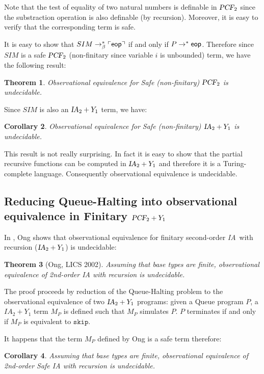 \documentclass{article}
\newtheorem{theorem}{Theorem}[section]
\newtheorem{corollary}[theorem]{Corollary}
\newcommand{\encode}[1]{\ulcorner #1 \urcorner}
\newcommand\eop{{\sf eop}}
\newcommand{\betared}{\rightarrow_\beta}
\newcommand\ialgol{{\textsl{IA}}}
\newcommand\pcf{\textsl{PCF}}
\newcommand\iaskip{\texttt{skip}}
\begin{document}
Note that the test of equality of two natural numbers is definable in $\pcf_2$ since the substraction operation is  also definable (by recursion). Moreover, it is easy to verify that the corresponding term is safe.


It is easy to show that $SIM \betared^* \encode{\eop}$ if and only if $P \rightarrow^* \eop$. Therefore since $SIM$ is a safe $\pcf_2$ 
(non-finitary since variable $i$ is unbounded) term, we have the following result:
\begin{theorem}
Observational equivalence for Safe (non-finitary) $\pcf_2$ is undecidable.
\end{theorem}
Since $SIM$ is also an $\ialgol_2 + Y_1$ term, we have:
\begin{corollary}
Observational equivalence for Safe (non-finitary) $\ialgol_2 + Y_1$ is undecidable.
\end{corollary}

This result is not really surprising. In fact it is easy to show that the partial recursive functions can be computed in $\ialgol_2 + Y_1$ and therefore it is a Turing-complete language. Consequently observational equivalence is undecidable.


\subsection{Reducing Queue-Halting into observational equivalence in Finitary $\pcf_2 + Y_1$}

In \cite{Ong02}, Ong shows that observational equivalence for finitary second-order \ialgol\ with recursion ($\ialgol_2 + Y_1$) is undecidable:
\begin{theorem}[Ong, LICS 2002]
Assuming that base types are finite, observational equivalence of 2nd-order IA with recursion is undecidable.
\end{theorem}

The proof proceeds by reduction of the Queue-Halting problem to the observational equivalence of two $\ialgol_2 + Y_1$ programs:
given a Queue program $P$, a $IA_2 + Y_1$ term $M_P$ is defined such that $M_P$ simulates $P$. $P$ terminates if and only if $M_P$ is equivalent to $\iaskip$.

It happens that the term $M_P$ defined by Ong is a safe term therefore:
\begin{corollary}
Assuming that base types are finite, observational equivalence of 2nd-order Safe IA with recursion is undecidable.
\end{corollary}
\end{document}
